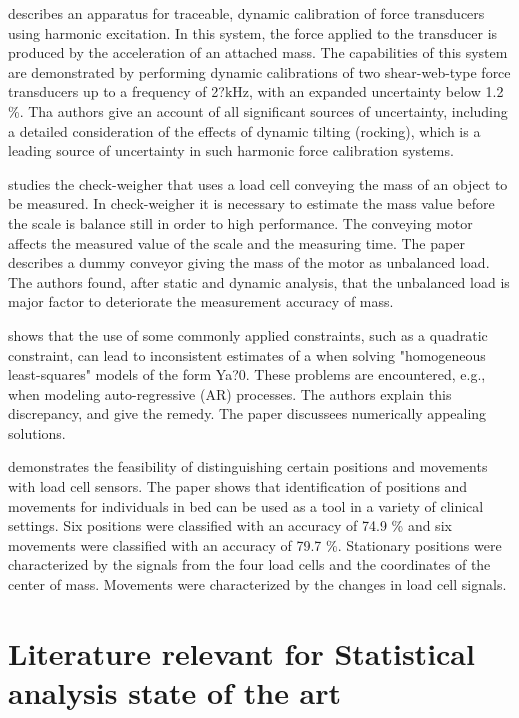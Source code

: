 \documentclass[11pt]{article}
\begin{document}
\citet{Vlajic16}  describes an apparatus for traceable, dynamic calibration of force transducers using harmonic excitation. In this system, the force applied to the transducer is produced by the acceleration of an attached mass. The capabilities of this system are demonstrated by performing dynamic calibrations of two shear-web-type force transducers up to a frequency of 2?kHz, with an expanded uncertainty below 1.2 \%. Tha authors give an account of all significant sources of uncertainty, including a detailed consideration of the effects of dynamic tilting (rocking), which is a leading source of uncertainty in such harmonic force calibration systems.

\citet{Yamani18} studies the check-weigher that uses a load cell conveying the mass of an object to be measured. In check-weigher it is necessary to estimate the mass value before the scale is balance still in order to high performance. The conveying motor affects the measured value of the scale and the measuring time. The paper describes a dummy conveyor giving the mass of the motor as unbalanced load. The authors found, after static and dynamic analysis, that the unbalanced load is major factor to deteriorate the measurement accuracy of mass.

\citet{Yeredor04homogeneous} shows that the use of some commonly applied constraints, such as a quadratic constraint, can lead to inconsistent estimates of a when solving  "homogeneous least-squares" models of the form Ya?0. These problems are encountered, e.g., when modeling auto-regressive (AR) processes. The authors explain this discrepancy, and give the remedy. The paper discussees numerically appealing solutions.

\citet{Zahradka18} demonstrates the feasibility of distinguishing certain positions and movements with load cell sensors. The paper shows that identification of positions and movements for individuals in bed can be used as a tool in a variety of clinical settings. Six positions were classified with an accuracy of 74.9 \% and six movements were classified with an accuracy of 79.7 \%. Stationary positions were characterized by the signals from the four load cells and the coordinates of the center of mass. Movements were characterized by the changes in load cell signals. 







\section{Literature relevant for Statistical analysis state of the art}
\end{document}

